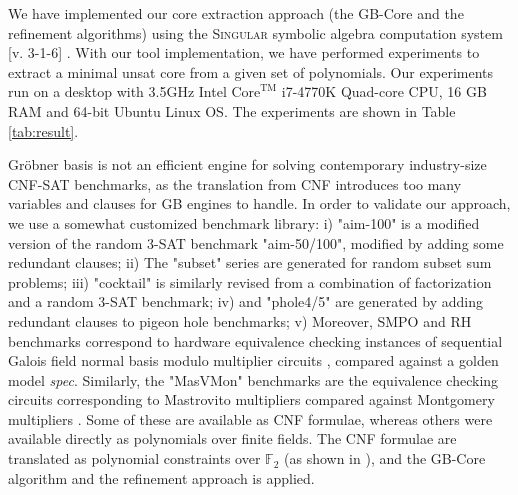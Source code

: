 We have implemented our core extraction approach (the GB-Core
and the refinement algorithms) using the \textsc{Singular} symbolic
algebra computation system [v. 3-1-6] \cite{DGPS}. With our
tool implementation, we have performed experiments to extract a
minimal unsat core from a given set of  
polynomials. Our experiments run on a desktop with
3.5GHz Intel $\text{Core}^\text{TM}$ i7-4770K Quad-core CPU, 16 GB RAM and
64-bit Ubuntu Linux OS. The experiments are shown in Table \ref{tab:result}. 

Gr\"obner basis is not an efficient engine for solving contemporary
industry-size CNF-SAT benchmarks, as the translation from CNF introduces
too many variables and clauses for GB engines to handle. In order to
validate our approach, we use a somewhat customized  benchmark
library: i) "aim-100" is a modified version  of the random 3-SAT
benchmark "aim-50/100", modified by adding some redundant clauses; ii)
The "subset" series are generated for random subset sum problems; iii)
"cocktail" is similarly revised from a combination of factorization
and a random 3-SAT benchmark; iv) and "phole4/5" are generated by
adding redundant clauses to pigeon hole benchmarks; v) Moreover,
SMPO and RH benchmarks correspond to hardware equivalence checking
instances of sequential Galois field normal basis modulo multiplier
circuits \cite{SMPO,RHmulti}, compared against a golden model
{\it spec}. Similarly, the "MasVMon" benchmarks are the equivalence
checking  circuits corresponding to Mastrovito multipliers compared
against  Montgomery multipliers \cite{lv:tcad2013}. Some of these are
available as CNF formulae, whereas others were available directly as
polynomials over finite fields. The CNF formulae are translated as
polynomial constraints over $\mathbb{F}_2$ (as shown in
\cite{condrat-tacas07}), and the GB-Core algorithm and the refinement
approach is applied.   

